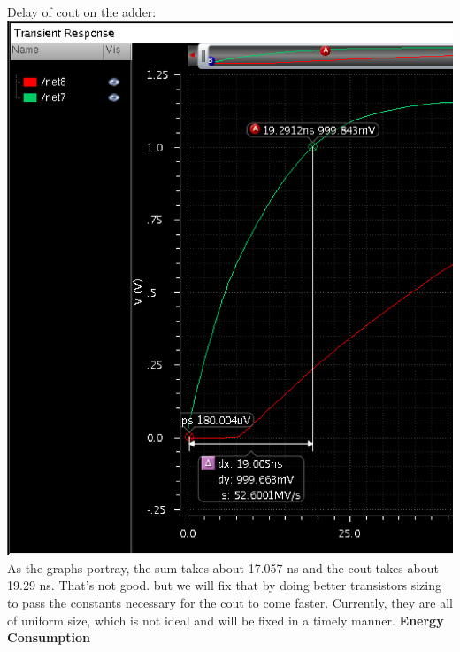 \documentclass[12pt]{article}
\begin{document}
  \newline \newline
  \newline \newline
  \newline \newline
  \newline \newline
  Delay of cout on the adder:
  \newline
  \includegraphics[scale=0.4]{delaycout.png} \\
  \newline \newline
  As the graphs portray, the sum takes about 17.057 ns and the cout takes about 19.29 ns. That's
  not good. but we will fix that by doing better transistors sizing to pass the constants necessary
  for the cout to come faster. Currently, they are all of uniform size, which is not ideal and will
  be fixed in a timely manner.
  \newline \newline
	\textbf{Energy Consumption}
  \newline \newline
\end{document}
